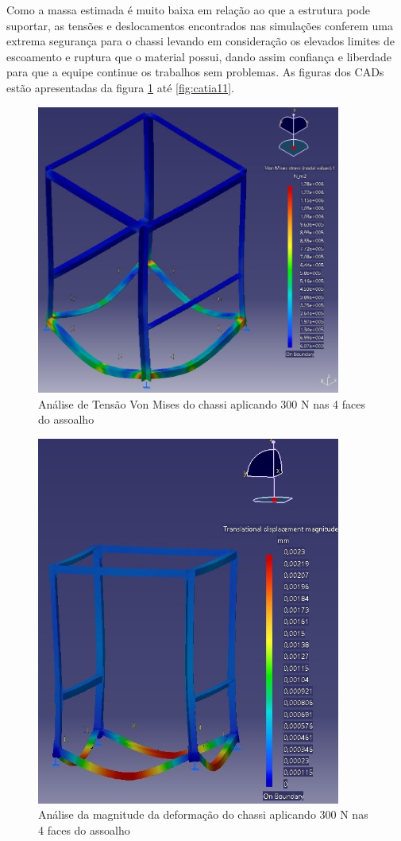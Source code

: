Como a massa estimada é muito baixa em relação ao que a estrutura pode suportar, as tensões e deslocamentos encontrados nas simulações conferem uma extrema segurança para o chassi levando em consideração os elevados limites de escoamento e ruptura que o material possui, dando assim confiança e liberdade para que a equipe continue os trabalhos sem problemas. As figuras dos CADs estão apresentadas da figura \ref{fig:catia1} até \ref{fig:catia11}.
\begin{figure}[H]
	\centering
	\includegraphics[width=10cm]{figuras/catia1.jpg}
	\caption{Análise de Tensão Von Mises do chassi aplicando 300 N nas 4 faces do assoalho}
	\label{fig:catia1}
\end{figure}
\begin{figure}[H]
	\centering
	\includegraphics[width=10cm]{figuras/catia2.jpg}
	\caption{Análise da magnitude da deformação do chassi aplicando 300 N nas 4 faces do assoalho}
	\label{fig:catia2}
\end{figure}

